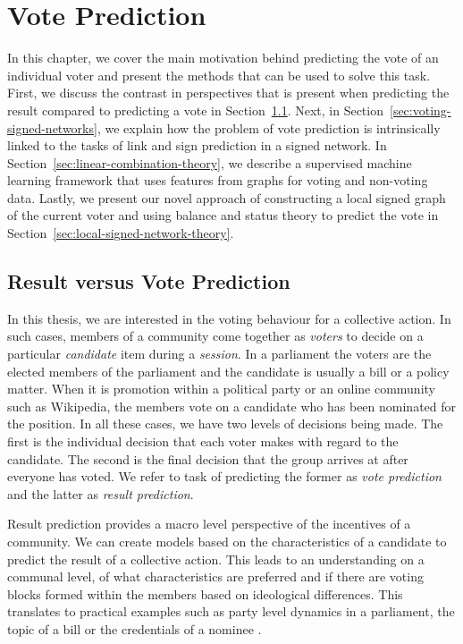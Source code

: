 \chapter{Vote Prediction}
\label{chp:vote-prediction}
In this chapter, we cover the main motivation behind predicting the vote of an individual voter and present the methods that can be used to solve this task.
First, we discuss the contrast in perspectives that is present when predicting the result compared to predicting a vote in Section~\ref{sec:result-vs-vote}.
Next, in Section~\ref{sec:voting-signed-networks}, we explain how the problem of vote prediction is intrinsically linked to the tasks of link and sign prediction in a signed network.
In Section~\ref{sec:linear-combination-theory}, we describe a supervised machine learning framework that uses features from graphs for voting and non-voting data.
Lastly, we present our novel approach of constructing a local signed graph of the current voter and using balance and status theory to predict the vote in Section~\ref{sec:local-signed-network-theory}. 


\section{Result versus Vote Prediction}
\label{sec:result-vs-vote}
In this thesis, we are interested in the voting behaviour for a collective action.
In such cases, members of a community come together as \textit{voters} to decide on a particular \textit{candidate} item during a \textit{session}.
In a parliament  the voters are the elected members of the parliament and the candidate is usually a bill or a policy matter.
When it is promotion within a political party or an online community such as Wikipedia, the members vote on a candidate who has been nominated for the position.
In all these cases, we have two levels of decisions being made.
The first is the individual decision that each voter makes with regard to the candidate.
The second is the final decision that the group arrives at after everyone has voted.
We refer to task of predicting the former as \textit{vote prediction} and the latter as \textit{result prediction}. 

Result prediction provides a macro level perspective of the incentives of a community.
We can create models based on the characteristics of a candidate to predict the result of a collective action.
This leads to an understanding on a communal level, of what characteristics are preferred and if there are voting blocks formed within the members based on ideological differences.
This translates to practical examples such as party level dynamics in a parliament, the topic of a bill or the credentials of a nominee \cite{burke2008mopping,yano2012textual,yogatama-etal-2011-predicting}. 

